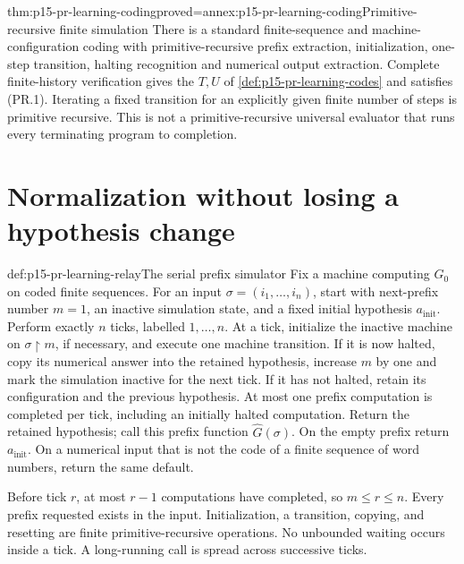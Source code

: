 \begin{hblemma}{thm:p15-pr-learning-coding}{proved=annex:p15-pr-learning-coding}{Primitive-recursive finite simulation}
There is a standard finite-sequence and machine-configuration coding
with primitive-recursive prefix extraction, initialization,
one-step transition, halting recognition and numerical output
extraction. Complete finite-history verification gives the \(T,U\)
of \cref{def:p15-pr-learning-codes} and satisfies (PR.1).
Iterating a fixed transition for an explicitly given finite number
of steps is primitive recursive. This is not a primitive-recursive
universal evaluator that runs every terminating program to completion.
\end{hblemma}

\section{Normalization without losing a hypothesis change}
\label{sec:p15-pr-learning-normalization}

\begin{hbmethod}{def:p15-pr-learning-relay}{The serial prefix simulator}
Fix a machine computing \(G_0\) on coded finite sequences.
For an input \(\sigma=(i_1,\ldots,i_n)\), start with next-prefix
number \(m=1\), an inactive simulation state, and a fixed initial
hypothesis \(a_{\mathrm{init}}\).
Perform exactly \(n\) ticks, labelled \(1,\ldots,n\).
At a tick, initialize the inactive machine on
\(\sigma{\upharpoonright}m\), if necessary, and execute one
machine transition. If it is now halted, copy its numerical
answer into the retained hypothesis, increase \(m\) by one and
mark the simulation inactive for the next tick.
If it has not halted, retain its configuration and the previous
hypothesis. At most one prefix computation is completed per tick,
including an initially halted computation.
Return the retained hypothesis; call this prefix function
\(\widehat G(\sigma)\). On the empty prefix return
\(a_{\mathrm{init}}\).
On a numerical input that is not the code of a finite sequence
of word numbers, return the same default.

Before tick \(r\), at most \(r-1\) computations have completed, so
\(m\leq r\leq n\). Every prefix requested exists in the input.
Initialization, a transition, copying, and resetting are finite
primitive-recursive operations. No unbounded waiting occurs inside
a tick. A long-running call is spread across successive ticks.
\end{hbmethod}

